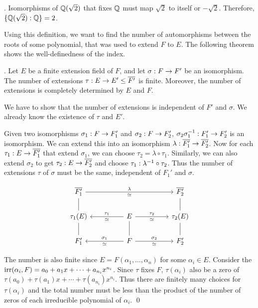 \ex. Isomorphisms of \(\mathbb{Q}(\sqrt{2})\) that fixes \(\mathbb{Q}\) must map \(\sqrt{2}\) to itself or \(-\sqrt{2}\). Therefore, \(\{\mathbb{Q}(\sqrt{2}) : \mathbb{Q}\} = 2\).

Using this definition, we want to find the number of automorphisms between the roots of some polynomial, that was used to extend \(F\) to \(E\). The following theorem shows the well-definedness of the index.

\thm. Let \(E\) be a finite extension field of \(F\), and let \(\sigma : F \rightarrow F'\) be an isomorphism. The number of extensions \(\tau : E \ra E' \leq \bar{F'}\) is finite. Moreover, the number of extensions is completely determined by \(E\) and \(F\).

\pf We have to show that the number of extensions is independent of \(F'\) and \(\sigma\). We already know the existence of \(\tau\) and \(E'\).

Given two isomorphisms \(\sigma_1 : F \rightarrow F_1'\) and \(\sigma_2 : F \rightarrow F_2'\), \(\sigma_2 \sigma_1^{-1} : F_1' \rightarrow F_2'\) is an isomorphism. We can extend this into an isomorphism \(\lambda : \bar{F_1'} \ra \bar{F_2'}\). Now for each \(\tau_1 : E \ra \bar{F_1'}\) that extend \(\sigma_1\), we can choose \(\tau_2 = \lambda \circ \tau_1\). Similarly, we can also extend \(\sigma_2\) to get \(\tau_2 : E \ra \bar{F_2'}\) and choose \(\tau_1 : \lambda^{-1} \circ \tau_2\). Thus the number of extensions \(\tau\) of \(\sigma\) must be the same, independent of \(F_1'\) and \(\sigma\).


\[
    \begin{tikzcd}
        \bar{F_1'} \arrow[dash]{d} \arrow{rrrr}{\lambda}[swap]{\simeq} && && \bar{F_2'} \arrow[dash]{d} \\
        \tau_1(E) \arrow[dash]{d}&& E \arrow{ll}{\simeq}[swap]{\tau_1} \arrow{rr}{\tau_2}[swap]{\simeq} \arrow[dash]{d} && \tau_2(E) \arrow[dash]{d} \\
        F_1' && F \arrow{ll}{\simeq}[swap]{\sigma_1} \arrow{rr}{\sigma_2}[swap]{\simeq} && F_2'
    \end{tikzcd}
\]

The number is also finite since \(E = F(\alpha_1, \dots, \alpha_n)\) for some \(\alpha_i \in E\). Consider the \(\mathrm{irr}(\alpha_i, F) = a_0 + a_1 x + \cdots + a_{n_i} x^{n_i}\). Since \(\tau\) fixes \(F\), \(\tau(\alpha_i)\) also be a zero of \(\tau(a_0) + \tau(a_1) x + \cdots + \tau(a_{n_i}) x^{n_i}\). Thus there are finitely many choices for \(\tau(\alpha_i)\) and the total number must be less than the product of the number of zeros of each irreducible polynomial of \(\alpha_i\). \qed
